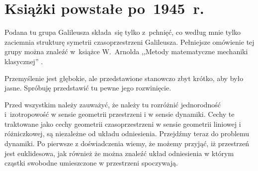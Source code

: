 \documentclass[a4paper,11pt]{article}
\begin{document}
\vspace{\spaceTwo}










\newpage
\section{Książki powstałe po~1945~r.}

\vspace{\spaceTwo}








\start {} Podana tu grupa Galileusza składa~się tylko z~pchnięć,
co według mnie tylko zaciemnia strukturę symetrii czasoprzestrzeni
Galileusza. Pełniejsze omówienie tej grupy można znaleźć w~książce
W.~Arnolda ,,Metody matematyczne mechaniki klasycznej''
\cite{ArnoldMetodyMatematyczneMechanikiKlasycznej1981}.

\vspace{\spaceFour}



\start {} Przemyślenie jest głębokie, ale przedstawione
stanowczo zbyt krótko, aby było jasne. Spróbuję przedstawić tu pewne
jego rozwinięcie.

Przed wszystkim należy zauważyć, że należy tu rozróżnić jednorodność
i~izotropowość w sensie geometrii przestrzeni i w sensie dynamiki.
Cechy te traktowane jako cechy geometrii czasoprzestrzeni w sensie
geometrii liniowej i różniczkowej, są niezależne od układu
odniesienia. Przejdźmy teraz do problemu dynamiki. Po pierwsze z
doświadczenia wiemy, że możemy przyjąć, iż przestrzeń jest
euklidesowa, jak również że można znaleźć układ odniesienia w którym
cząstki swobodne umieszczone w przestrzeni spoczywają.

\vspace{\spaceFour}
\end{document}
